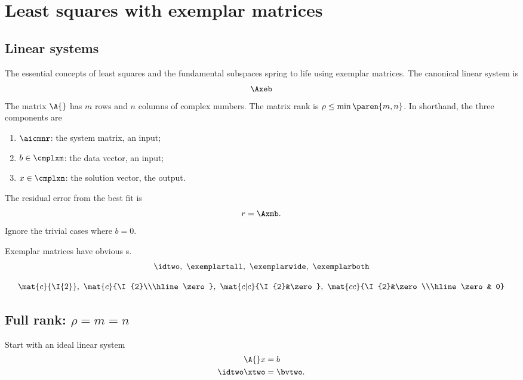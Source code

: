 \chapter[Least squares with exemplars]{Least squares with exemplar matrices}

\section{Linear systems}  %
The essential concepts of least squares and the fundamental subspaces spring to life using exemplar matrices. The canonical linear system is
  \begin{equation*}
    \Axeb
  \end{equation*}
The matrix $\A{}$ has $m$ rows and $n$ columns of complex numbers. The matrix rank is $\rho\le\min\paren{m,n}$. In shorthand, the three components are
\begin{enumerate}
	\item $\aicmnr$: the system matrix, an input;
	\item $b\in\cmplxm$: the data vector, an input;
	\item $x\in\cmplxn$: the solution vector, the output.
\end{enumerate}
The residual error from the best fit is 
  \begin{equation}
    r = \Axmb .
  \end{equation}
Ignore the trivial cases where $b=0$.

Exemplar matrices have obvious \asvd s.
$$ \idtwo,\ \exemplartall,\ \exemplarwide,\ \exemplarboth$$

$$ \mat{c}{\I{2}},\ \mat{c}{\I{2}\\\hline\zero},\ \mat{c|c}{\I{2}&\zero},\ \mat{cc}{\I{2}&\zero\\\hline\zero & 0} $$

\section{Full rank: $\rho = m = n$}
Start with an ideal linear system
  \begin{equation}
    \begin{split}
      \A{} x &= b \\
      \idtwo \xtwo &= \bvtwo.
    \label{eqn:ideal}
    \end{split}
  \end{equation}

